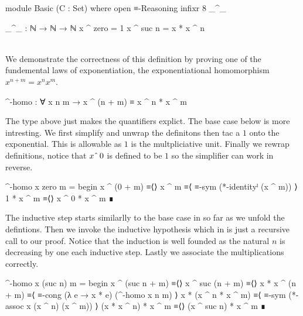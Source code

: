 \documentclass[./Thesis.tex]{subfiles}
\begin{document}
\begin{code}[hide]
  module Basic (C : Set) where
    open ≡-Reasoning 
    infixr 8 _^_
\end{code}
\begin{code}
    _^_ : ℕ → ℕ → ℕ
    x ^ zero = 1
    x ^ suc n = x * x ^ n
\end{code} \\

We demonstrate the correctness of this definition by proving one of the
fundemental laws of exponentiation,
the exponentiational homomorphism $x^{n + m} = x^n x^m$.
\begin{code}
    ^-homo : ∀ x n m → x ^ (n + m) ≡ x ^ n * x ^ m
\end{code}
The type above just makes the quantifiers explict. The base case below
is more intresting. We first simplify and unwrap the definitons then
tac a $1$ onto the exponential. This is allowable as $1$ is the
multpliciative unit. Finally we rewrap definitions, notice that
$x \string^{} \, 0$ is defined to be $1$ so the simplifier can work in reverse.
\begin{code}
    ^-homo x zero m = begin
      x ^ (0 + m)   ≡⟨⟩
      x ^ m         ≡⟨ ≡-sym (*-identityˡ (x ^ m)) ⟩
      1 * x ^ m     ≡⟨⟩
      x ^ 0 * x ^ m ∎
\end{code}
The inductive step starts similarlly to the base case in so far as we
unfold the defintions. Then we invoke the inductive hypothesis which in \Agda{}
is just a recursive call to our proof. Notice that the induction is well founded
as the natural $n$ is decreasing by one each inductive step.
Lastly we associate the multiplications correctly.
\begin{code}
    ^-homo x (suc n) m = begin
      x ^ (suc n + m)     ≡⟨⟩
      x ^ suc (n + m)     ≡⟨⟩
      x * x ^ (n + m)     ≡⟨ ≡-cong (λ e → x * e) (^-homo x n m) ⟩
      x * (x ^ n * x ^ m) ≡⟨ ≡-sym (*-assoc x (x ^ n) (x ^ m)) ⟩
      (x * x ^ n) * x ^ m ≡⟨⟩
      (x ^ suc n) * x ^ m ∎
\end{code}
\end{document}
